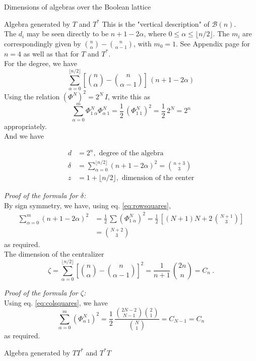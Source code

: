\documentclass[12pt,reqno]{amsart}
\newcommand{\FF}[2]{\Phi^{#1}_{#2}}
\begin{document}
\begin{section}{Dimensions of algebras over the Boolean lattice}
\begin{subsection}{Algebra generated by $T$ and $T^*$}
This is the "vertical description" of $\mathcal{B}(n)$.\\

The $d_i$ may be seen directly to be $n+1-2\alpha$, where $0\le \alpha\le \lfloor n/2\rfloor$.
The $m_i$ are correspondingly given by $\binom{n}{\alpha}-\binom{n}{\alpha-1}$, with $m_0=1$.
See Appendix page for $n=4$ as well as that for  $T$ and $T^*$.\\

For the degree, we have
$$
\sum_{\alpha=0}^{\lfloor n/2\rfloor} \left[\binom{n}{\alpha}-\binom{n}{\alpha-1}\right]\,(n+1-2\alpha)
$$
Using the relation $(\Phi^N)^2=2^N\,I$, write this as
$$\sum_{\alpha=0}^m \FF{N}{1\;\alpha}\FF{N}{\alpha\;1}=\frac12\,(\FF{N}{1\;1})^2=\frac12\,2^N=2^n$$
appropriately.\\

And we have

\begin{align*}
d&=2^n, \text{ degree of the algebra}\\
\delta&=\sum_{\alpha=0}^{\lfloor n/2\rfloor} (n+1-2\alpha)^2=\binom{n+3}{3} \\
          z&=1+\lfloor n/2\rfloor, \text{ dimension of the center}
\end{align*}

\textsl{Proof of the formula for $\delta$:}\\

By sign symmetry, we have, using eq. \eqref{eq:rowsquares},
\begin{align*}
\sum_{\alpha=0}^m (n+1-2\alpha)^2&=\frac12\,\sum (\FF{N}{1\;\alpha})^2=\frac12\,\left[(N+1)N+2\,\binom{N+1}{3}\right] \\
&=\binom{N+2}{3}
\end{align*}
as required.\\

The dimension of the centralizer
$$\zeta=\sum_{\alpha=0}^{\lfloor n/2\rfloor} \left[\binom{n}{\alpha}-\binom{n}{\alpha-1}\right]^2=\frac{1}{n+1}\,\binom{2n}{n}=C_n\ .$$

\textsl{Proof of the formula for $\zeta$:}\\

Using eq. \eqref{eq:colsquares}, we have	
$$\sum_{\alpha=0}^m (\FF{N}{\alpha\;1})^2=\frac12\,\frac{\binom{2N-2}{N-1}\binom{2}{1}}{\binom{N}{1}}=C_{N-1}=C_n$$
as required.

\end{subsection}

\begin{subsection}{Algebra generated by $TT^*$ and $T^*T$}
\hfill\\


\end{subsection}
\end{section}
\end{document}
